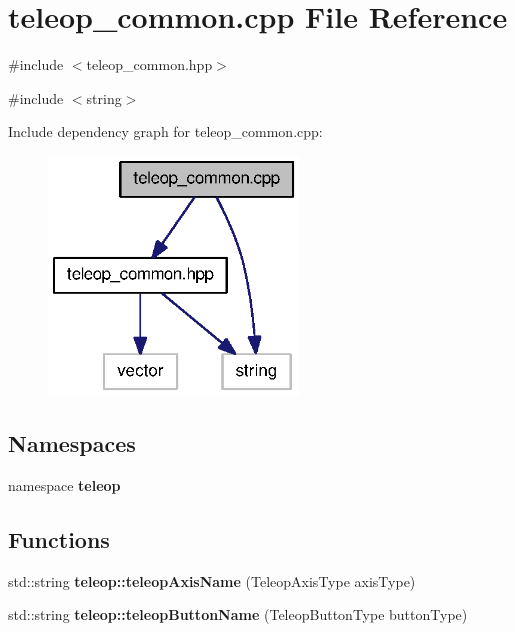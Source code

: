 \section{teleop\_\-common.cpp File Reference}
\label{teleop__common_8cpp}
{\ttfamily \#include $<$teleop\_\-common.hpp$>$}\par
{\ttfamily \#include $<$string$>$}\par
Include dependency graph for teleop\_\-common.cpp:
\nopagebreak
\begin{figure}[H]
\begin{center}
\leavevmode
\includegraphics[width=188pt]{teleop__common_8cpp__incl}
\end{center}
\end{figure}
\subsection*{Namespaces}
\begin{DoxyCompactItemize}
\item 
namespace {\bf teleop}
\end{DoxyCompactItemize}
\subsection*{Functions}
\begin{DoxyCompactItemize}
\item 
std::string {\bf teleop::teleopAxisName} (TeleopAxisType axisType)
\item 
std::string {\bf teleop::teleopButtonName} (TeleopButtonType buttonType)
\end{DoxyCompactItemize}
